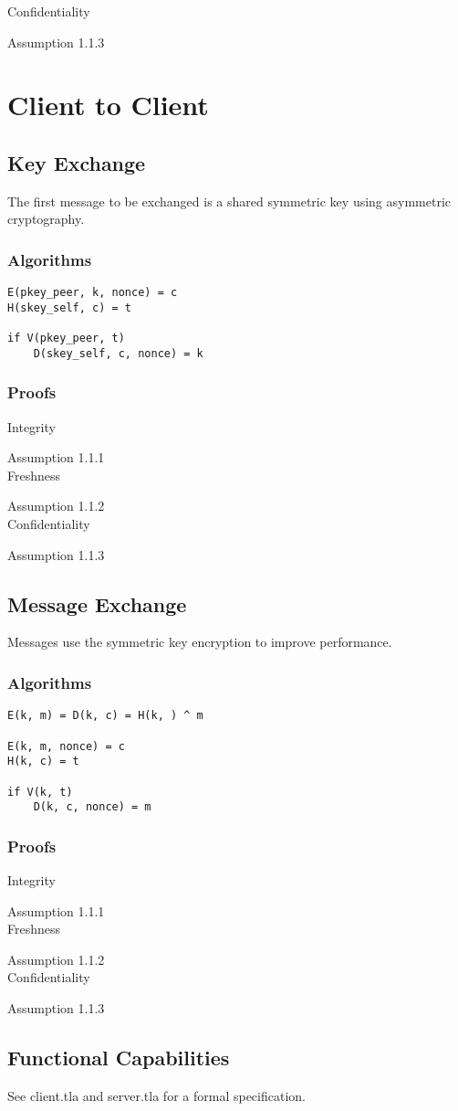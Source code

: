 \documentclass{article}
\begin{document}
Confidentiality

Assumption 1.1.3 \\

\section{Client to Client}
\subsection{Key Exchange}
The first message to be exchanged is a shared symmetric key using asymmetric cryptography.

\subsubsection{Algorithms}
\begin{verbatim}
E(pkey_peer, k, nonce) = c
H(skey_self, c) = t

if V(pkey_peer, t)
    D(skey_self, c, nonce) = k
\end{verbatim}

\subsubsection{Proofs}
Integrity

Assumption 1.1.1 \\

Freshness

Assumption 1.1.2 \\

Confidentiality

Assumption 1.1.3 \\

\subsection{Message Exchange}
Messages use the symmetric key encryption to improve performance.

\subsubsection{Algorithms}
\begin{verbatim}
E(k, m) = D(k, c) = H(k, ) ^ m

E(k, m, nonce) = c
H(k, c) = t

if V(k, t)
    D(k, c, nonce) = m
\end{verbatim}

\subsubsection{Proofs}
Integrity

Assumption 1.1.1 \\

Freshness

Assumption 1.1.2 \\

Confidentiality

Assumption 1.1.3 \\

\subsection{Functional Capabilities}
See client.tla and server.tla for a formal specification.
\end{document}
